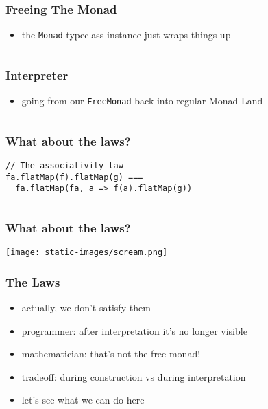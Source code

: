 \documentclass{beamer}
\begin{document}
\begin{frame}[fragile]
  \frametitle{Freeing The Monad}
  \begin{itemize}
  \item the \texttt{Monad} typeclass instance just wraps things up
  \end{itemize}
  \begin{center}
    \inputminted{scala}{snippets/free-instance.scala}
  \end{center}
\end{frame}

\begin{frame}[fragile]
  \frametitle{Interpreter}
  \begin{itemize}
  \item going from our \texttt{FreeMonad} back into regular Monad-Land
  \end{itemize}
  \inputminted{scala}{snippets/free-interp.scala}
\end{frame}

\begin{frame}[fragile]
  \frametitle{What about the laws?}
  \begin{verbatim}
// The associativity law
fa.flatMap(f).flatMap(g) ===
  fa.flatMap(fa, a => f(a).flatMap(g))
  \end{verbatim}
  \vfill{}
  \inputminted[autogobble]{scala}{snippets/what-about-laws.scala}
\end{frame}

\begin{frame}[fragile]
  \frametitle{What about the laws?}
  \begin{center}
    \texttt{[image: static-images/scream.png]}
  \end{center}
\end{frame}

\begin{frame}[fragile]
  \frametitle{The Laws}
  \begin{itemize}
  \item actually, we don't satisfy them
  \item programmer: after interpretation it's no longer visible
  \item mathematician: that's not the free monad!
  \item tradeoff: during construction vs during interpretation
  \item let's see what we can do here
  \end{itemize}
\end{frame}
\end{document}
